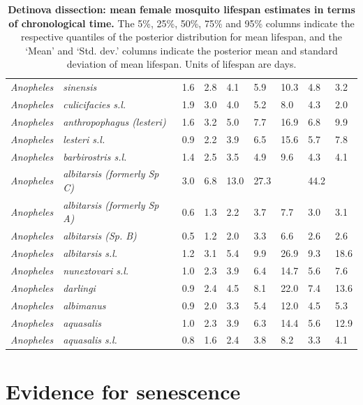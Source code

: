 \documentclass[12pt]{article}
\begin{document}
\begin{table}[htbp!]
\begin{tabular}{l|l|l|l|l|l|l|l|l}
	\textit{Anopheles} & \textit{sinensis} & 1.6 & 2.8 & 4.1 & 5.9 & 10.3 & 4.8 & 3.2 \\
	\textit{Anopheles} & \textit{culicifacies s.l.} & 1.9 & 3.0 & 4.0 & 5.2 & 8.0 & 4.3 & 2.0 \\
	\textit{Anopheles} & \textit{anthropophagus (lesteri)} & 1.6 & 3.2 & 5.0 & 7.7 & 16.9 & 6.8
	& 9.9 \\
	\textit{Anopheles} & \textit{lesteri s.l.} & 0.9 & 2.2 & 3.9 & 6.5 & 15.6 & 5.7 & 7.8 \\
	\textit{Anopheles} & \textit{barbirostris s.l.} & 1.4 & 2.5 & 3.5 & 4.9 & 9.6 & 4.3 & 4.1 \\
	\textit{Anopheles} & \textit{albitarsis (formerly Sp C)} & 3.0 & 6.8 & 13.0 & 27.3
	& \text{$>$100} & 44.2 & \text{$>$100} \\
	\textit{Anopheles} & \textit{albitarsis (formerly Sp A)} & 0.6 & 1.3 & 2.2 & 3.7 & 7.7 & 3.0
	& 3.1 \\
	\textit{Anopheles} & \textit{albitarsis (Sp. B)} & 0.5 & 1.2 & 2.0 & 3.3 & 6.6 & 2.6 & 2.6
	\\
	\textit{Anopheles} & \textit{albitarsis s.l.} & 1.2 & 3.1 & 5.4 & 9.9 & 26.9 & 9.3 & 18.6 \\
	\textit{Anopheles} & \textit{nuneztovari s.l.} & 1.0 & 2.3 & 3.9 & 6.4 & 14.7 & 5.6 & 7.6 \\
	\textit{Anopheles} & \textit{darlingi} & 0.9 & 2.4 & 4.5 & 8.1 & 22.0 & 7.4 & 13.6 \\
	\textit{Anopheles} & \textit{albimanus} & 0.9 & 2.0 & 3.3 & 5.4 & 12.0 & 4.5 & 5.3 \\
	\textit{Anopheles} & \textit{aquasalis} & 1.0 & 2.3 & 3.9 & 6.3 & 14.4 & 5.6 & 12.9 \\
	\textit{Anopheles} & \textit{aquasalis s.l.} & 0.8 & 1.6 & 2.4 & 3.8 & 8.2 & 3.3 & 4.1 \\
\end{tabular}
\caption{\textbf{Detinova dissection: mean female mosquito lifespan estimates in terms of chronological time.} The 5\%, 25\%, 50\%, 75\% and 95\% columns indicate the respective quantiles of the posterior distribution for mean lifespan, and the `Mean' and `Std. dev.' columns indicate the posterior mean and standard deviation of mean lifespan.  Units of lifespan are days.}
\label{tab:detinova_lifespan_chronological}%
\end{table}


\section{Evidence for senescence}
\end{document}
